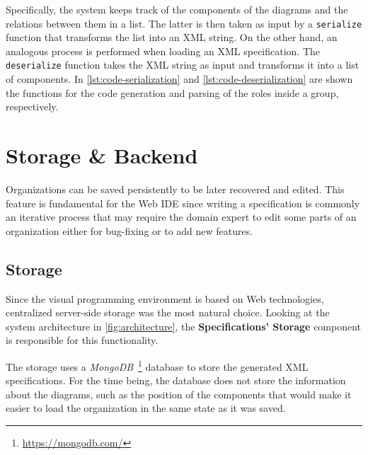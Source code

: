 Specifically, the system keeps track of the components of the diagrams and the relations between them in a list.
The latter is then taken as input by a \texttt{serialize} function that transforms the list into an XML string.
On the other hand, an analogous process is performed when loading an XML specification.
The \texttt{deserialize} function takes the XML string as input and transforms it into a list of components.
In \cref{lst:code-serialization} and \cref{lst:code-deserialization} are shown the functions for the code generation and parsing of the roles inside a group, respectively.

\begin{figure}[H]
    
\end{figure}

\begin{figure}[H]
    
\end{figure}

\section{Storage \& Backend}
Organizations can be saved persistently to be later recovered and edited.
This feature is fundamental for the Web IDE since writing a specification is commonly an iterative process that may require the domain expert to edit some parts of an organization either for bug-fixing or to add new features.

\subsection{Storage}

Since the visual programming environment is based on Web technologies, centralized server-side storage was the most natural choice.
Looking at the system architecture in \cref{fig:architecture}, the \textbf{Specifications' Storage} component is responsible for this functionality.

The storage uses a \textit{MongoDB}~\footnote{\url{https://mongodb.com/}} database to store the generated XML specifications.
For the time being, the database does not store the information about the diagrams, such as the position of the components that would make it easier to load the organization in the same state as it was saved.

